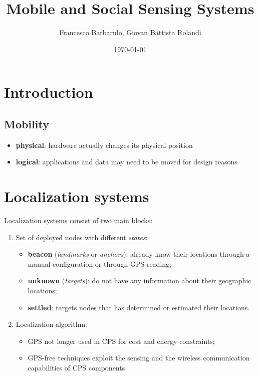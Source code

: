 \documentclass[a4paper,12pt]{article}
\title{Mobile and Social Sensing Systems}
\author{Francesco Barbarulo, Giovan Battista Rolandi}
\date{\monthyeardate\today}
\begin{document}

\maketitle
{}

\tableofcontents

\newpage


\section{Introduction}
\subsection{Mobility}
\begin{itemize}
  \item \textbf{physical}: hardware actually changes its physical position
  \item \textbf{logical}: applications and data may need to be moved for design reasons
\end{itemize}

\section{Localization systems}
Localization systems consist of two main blocks:
\begin{enumerate}[label=\roman*.]
	\item Set of deployed nodes with different \textit{states}:
		\begin{itemize}
		 	\item \textbf{beacon} (\textit{landmarks} or \textit{anchors}): already know their locations through a manual configuration or through GPS reading;
		  	\item \textbf{unknown} (\textit{targets}): do not have any information about their geographic locations;
		  	\item \textbf{settled}: targets nodes that has determined or estimated their locations.
		\end{itemize}
	\item Localization algorithm:
		\begin{itemize}
			\item GPS not longer used in CPS for cost and energy constraints;
			\item GPS-free techniques exploit the sensing and the wireless communication capabilities of CPS components
		\end{itemize}
\end{enumerate}
\end{document}
